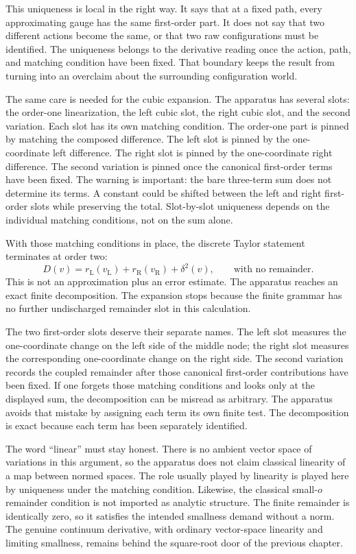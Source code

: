 This uniqueness is local in the right way. It says that at a fixed path, every
approximating gauge has the same first-order part. It does not say that two
different actions become the same, or that two raw configurations must be
identified. The uniqueness belongs to the derivative reading once the action,
path, and matching condition have been fixed. That boundary keeps the result
from turning into an overclaim about the surrounding configuration world.

The same care is needed for the cubic expansion. The apparatus has several
slots: the order-one linearization, the left cubic slot, the right cubic slot,
and the second variation. Each slot has its own matching condition. The
order-one part is pinned by matching the composed difference. The left slot is
pinned by the one-coordinate left difference. The right slot is pinned by the
one-coordinate right difference. The second variation is pinned once the
canonical first-order terms have been fixed. The warning is important: the bare
three-term sum does not determine its terms. A constant could be shifted between
the left and right first-order slots while preserving the total. Slot-by-slot
uniqueness depends on the individual matching conditions, not on the sum alone.

With those matching conditions in place, the discrete Taylor statement
terminates at order two:
\[
  D(v)
  =
  r_{\mathrm L}(v_{\mathrm L})
  +
  r_{\mathrm R}(v_{\mathrm R})
  +
  \delta^2(v),
  \qquad\text{with no remainder.}
\]
This is not an approximation plus an error estimate. The apparatus reaches an
exact finite decomposition. The expansion stops because the finite grammar has
no further undischarged remainder slot in this calculation.

The two first-order slots deserve their separate names. The left slot measures
the one-coordinate change on the left side of the middle node; the right slot
measures the corresponding one-coordinate change on the right side. The second
variation records the coupled remainder after those canonical first-order
contributions have been fixed. If one forgets those matching conditions and
looks only at the displayed sum, the decomposition can be misread as arbitrary.
The apparatus avoids that mistake by assigning each term its own finite test.
The decomposition is exact because each term has been separately identified.

The word ``linear'' must stay honest. There is no ambient vector space of
variations in this argument, so the apparatus does not claim classical
linearity of a map between normed spaces. The role usually played by linearity
is played here by uniqueness under the matching condition. Likewise, the
classical small-\(o\) remainder condition is not imported as analytic structure.
The finite remainder is identically zero, so it satisfies the intended
smallness demand without a norm. The genuine continuum derivative, with
ordinary vector-space linearity and limiting smallness, remains behind the
square-root door of the previous chapter.


